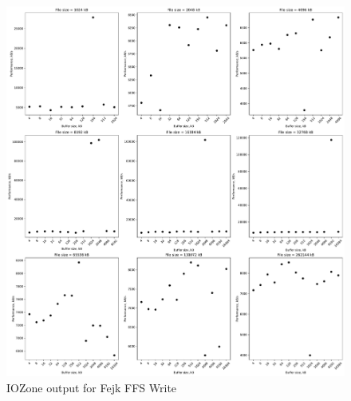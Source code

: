 \begin{figure}[!htb]
	\label{fig:bench_fffs_write}
	\begin{center}
		\includegraphics[width=1.0\textwidth]{figures/benchmarking/fejk-ffs/Write.pdf}
	\end{center}
	\caption{IOZone output for Fejk FFS Write}
\end{figure}

